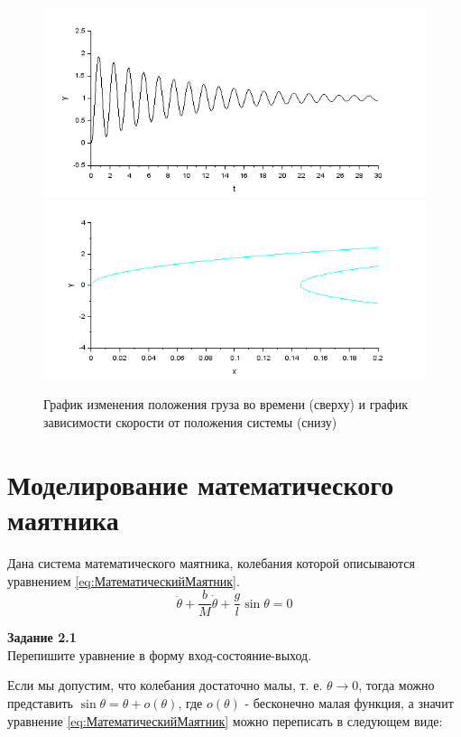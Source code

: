 \documentclass[a4paper, 12pt]{article}
\begin{document}
\begin{figure}[h!]
	\centering
	\includegraphics[scale=0.8]{graph1-1}
	\includegraphics[scale=0.8]{graph1-2}
	\caption{График изменения положения груза во времени (сверху) и график зависимости скорости от положения системы (снизу) }
	\label{p:Графики1}
\end{figure}

\newpage

\section{Моделирование математического маятника}
Дана система математического маятника, колебания которой описываются уравнением \ref{eq:МатематическийМаятник}.
\begin{equation}
\ddot{\theta} + \frac{b}{M}\dot{\theta} + \frac{g}{l}\sin\theta = 0
\label{eq:МатематическийМаятник}
\end{equation}

\textbf{Задание 2.1} \\ Перепишите уравнение в форму вход-состояние-выход.

Если мы допустим, что колебания достаточно малы, т. е. $\theta \to 0$, тогда можно представить $\sin\theta = \theta + o(\theta)$, где $o(\theta)$ - бесконечно малая функция, а значит уравнение \ref{eq:МатематическийМаятник} можно переписать в следующем виде:
\end{document}
